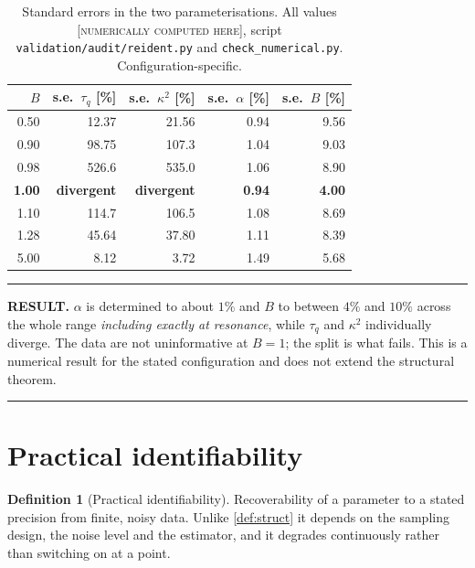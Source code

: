 \documentclass[11pt,a4paper]{article}
\theoremstyle{definition}
\newtheorem{definitionx}{Definition}[section]
\newenvironment{resultbox}%
  {\par\medskip\noindent\begin{minipage}{\linewidth}%
   \rule{\linewidth}{1.0pt}\par\noindent\textbf{RESULT.}\enspace}%
  {\par\rule{\linewidth}{1.0pt}\end{minipage}\par\medskip}
\newcommand{\NUM}{\textcolor{red!55!black}{\footnotesize[\textsc{numerically computed here}]}}
\newcommand{\tq}{\tau_{q}}
\newcommand{\kk}{\kappa^{2}}
\newcommand{\Bnum}{B}
\begin{document}
\begin{table}[H]
\centering
\caption{Standard errors in the two parameterisations. All values
         \NUM, script \texttt{validation/audit/reident.py} and
         \texttt{check\_numerical.py}. Configuration-specific.}
\label{tab:reparam}
\small
\begin{tabular}{@{}rrrrr@{}}
\toprule
$\Bnum$ & s.e.\ $\tq$ [\%] & s.e.\ $\kk$ [\%] &
s.e.\ $\alpha$ [\%] & s.e.\ $\Bnum$ [\%] \\
\midrule
0.50 & 12.37 & 21.56 & 0.94 & 9.56 \\
0.90 & 98.75 & 107.3 & 1.04 & 9.03 \\
0.98 & 526.6 & 535.0 & 1.06 & 8.90 \\
\textbf{1.00} & \textbf{divergent} & \textbf{divergent} &
  \textbf{0.94} & \textbf{4.00} \\
1.10 & 114.7 & 106.5 & 1.08 & 8.69 \\
1.28 & 45.64 & 37.80 & 1.11 & 8.39 \\
5.00 & 8.12  & 3.72  & 1.49 & 5.68 \\
\bottomrule
\end{tabular}
\end{table}

\begin{resultbox}
$\alpha$ is determined to about $1\%$ and $\Bnum$ to between $4\%$ and $10\%$
across the whole range \emph{including exactly at resonance}, while $\tq$ and
$\kk$ individually diverge. The data are not uninformative at $\Bnum=1$; the
split is what fails. This is a numerical result for the stated configuration
and does not extend the structural theorem.
\end{resultbox}

\section{Practical identifiability}
\label{sec:practical}

\begin{definitionx}[Practical identifiability]
\label{def:practical}
Recoverability of a parameter to a stated precision from finite, noisy data.
Unlike \cref{def:struct} it depends on the sampling design, the noise level and
the estimator, and it degrades continuously rather than switching on at a
point.
\end{definitionx}
\end{document}
